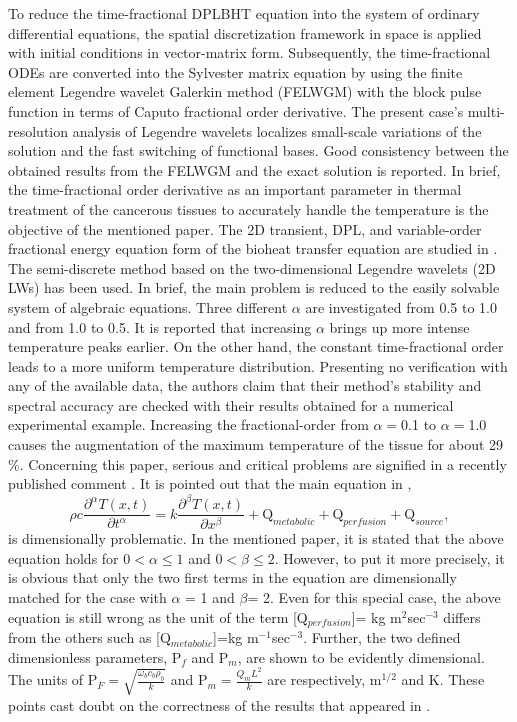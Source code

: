 \documentclass[sn-mathphys]{sn-jnl}%
\theoremstyle{thmstyleone}%
\theoremstyle{thmstyletwo}%
\theoremstyle{thmstylethree}%
\begin{document}
To reduce the time-fractional DPLBHT equation into the system of ordinary differential equations, the spatial discretization framework in space is applied with initial conditions in vector-matrix form. Subsequently, the time-fractional ODEs are converted into the Sylvester matrix equation by using the finite element Legendre wavelet Galerkin method (FELWGM) with the block pulse function in terms of Caputo fractional order derivative. The present case's multi-resolution analysis of Legendre wavelets localizes small-scale variations of the solution and the fast switching of functional bases. Good consistency between the obtained results from the FELWGM and the exact solution is reported. In brief, the time-fractional order derivative as an important parameter in thermal treatment of the cancerous tissues to accurately handle the temperature is the objective of the mentioned paper. The 2D transient, DPL, and variable-order fractional energy equation form of the bioheat transfer equation are studied in \cite{Hosseininia2019}. The semi-discrete method based on the two-dimensional Legendre wavelets (2D LWs) has been used. In brief, the main problem is reduced to the easily solvable system of algebraic equations. Three different $\alpha$ are investigated from 0.5 to 1.0 and from 1.0 to 0.5. It is reported that increasing $\alpha$ brings up more intense temperature peaks earlier. On the other hand, the constant time-fractional order leads to a more uniform temperature distribution. Presenting no verification with any of the available data, the authors claim that their method's stability and spectral accuracy are checked with their results obtained for a numerical experimental example. Increasing the fractional-order from $\alpha=$0.1 to $\alpha=$1.0 causes the augmentation of the maximum temperature of the tissue for about 29$\%$. Concerning this paper, serious and critical problems are signified in a recently published comment \cite{Pantokratoras2020}. It is pointed out that the main equation in \cite{Hosseininia2019},
\begin{equation}
\rho c \frac{\partial^{\alpha}T(x,t)}{\partial t^{\alpha}}=k\frac{\partial^{\beta} T(x,t)}{\partial x^{\beta}}+\mathrm{Q}_{metabolic}+\mathrm{Q}_{perfusion}+\mathrm{Q}_{source},
\end{equation}
is dimensionally problematic. In the mentioned paper, it is stated that the above equation holds for $0< \alpha \leq 1$ and $0< \beta \leq 2$. However, to put it more precisely, it is obvious that only the two first terms in the equation are dimensionally matched for the case with $\alpha$ = 1 and $\beta$= 2. Even for this special case, the above equation is still wrong as the unit of the term [Q$_{perfusion}$]= kg m$^2$sec$^{-3}$ differs from the others such as [Q$_{metabolic}$]=kg m$^{-1}$sec$^{-3}$. Further, the two defined dimensionless parameters, P$_f$ and P$_m$, are shown to be evidently dimensional. The units of $\mathrm{P}_F=\sqrt{\frac{\omega_b c_b \rho_b}{k}}$ and $\mathrm{P}_{m}=\frac{Q_m L^2}{k}$ are respectively, m$^{1/2}$ and K. These points cast doubt on the correctness of the results that appeared in \cite{Hosseininia2019}.
\end{document}
